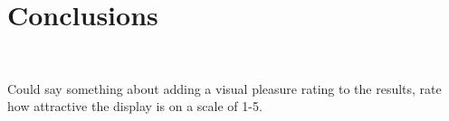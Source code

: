 \section{Conclusions}~\label{conclusions}

Could say something about adding a visual pleasure rating to the results, rate how attractive the display is on a scale of 1-5.